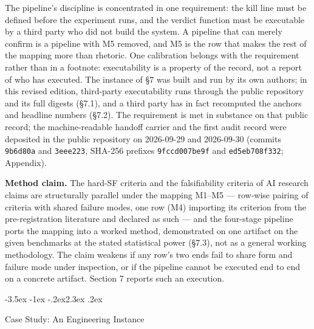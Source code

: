 \documentclass[11pt,a4paper]{article}
\makeatletter
\renewcommand\section{\@startsection{section}{1}{\z@}%
  {-3.5ex \@plus -1ex \@minus -.2ex}{2.3ex \@plus .2ex}%
  {\normalfont\Large\bfseries\raggedright}}
\makeatother
\begin{document}
The pipeline's discipline is concentrated in one requirement: the kill line must be defined before the experiment runs, and the verdict function must be executable by a third party who did not build the system. A pipeline that can merely confirm is a pipeline with M5 removed, and M5 is the row that makes the rest of the mapping more than rhetoric. One calibration belongs with the requirement rather than in a footnote: executability is a property of the record, not a report of who has executed. The instance of §7 was built and run by its own authors; in this revised edition, third-party executability runs through the public repository and its full digests (§7.1), and a third party has in fact recomputed the anchors and headline numbers (§7.2). The requirement is met in substance on that public record; the machine-readable handoff carrier and the first audit record were deposited in the public repository on 2026-09-29 and 2026-09-30 (commits \texttt{9b6d80a} and \texttt{3eee223}, SHA-256 prefixes \texttt{9fccd007be9f} and \texttt{ed5eb708f332}; Appendix).

\textbf{Method claim.} The hard-SF criteria and the falsifiability criteria of AI research claims are structurally parallel under the mapping M1–M5 — row-wise pairing of criteria with shared failure modes, one row (M4) importing its criterion from the pre-registration literature and declared as such — and the four-stage pipeline ports the mapping into a worked method, demonstrated on one artifact on the given benchmarks at the stated statistical power (§7.3), not as a general working methodology. The claim weakens if any row's two ends fail to share form and failure mode under inspection, or if the pipeline cannot be executed end to end on a concrete artifact. Section 7 reports such an execution.

\section{Case Study: An Engineering Instance}
\end{document}

